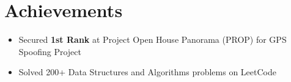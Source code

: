 \documentclass[letterpaper,10pt]{article}
\begin{document}
\section{Achievements}
\begin{itemize}[leftmargin=0.25in]
    \small
    \item Secured \textbf{1st Rank} at Project Open House Panorama (PROP) for GPS Spoofing Project
    \item Solved 200+ Data Structures and Algorithms problems on LeetCode
\end{itemize}
\end{document}
